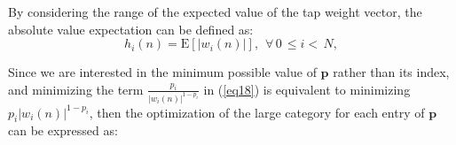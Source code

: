 \vspace{-0.5cm}
\par
\noindent  By considering the range of the expected value of the tap weight vector, the absolute value expectation can be defined as:
\vspace{-0.1cm}
\begin{equation}
h_i(n)=\mathrm{E}\left[|w_{i}(n)|\right], \hspace{5pt}\forall\hspace{2pt} 0\hspace{2pt}\leq i<\hspace{2pt}N, \label{eq19}
\end{equation}

\noindent Since we are interested in the minimum possible value of $\textbf{p}$ rather than its index, and minimizing the term $\frac{p_{i}}{|w_{i}(n)|^{1-p_{i}}}$ in (\ref{eq18}) is equivalent to minimizing $p_{i}|w_{i}(n)|^{1-p_{i}}$, then the optimization of the large category for each entry of $\textbf{p}$ can be expressed as:



